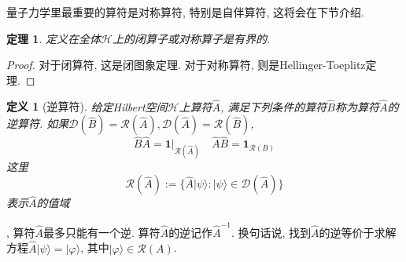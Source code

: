 \documentclass[a4paper,11pt]{book}
\newtheorem{definition}{\hspace{2em}定义}[section]
\newtheorem{theorem}{\hspace{2em}定理}[section]
\newtheorem{proof}{证明}[section]
\begin{document}
量子力学里最重要的算符是对称算符, 特别是自伴算符, 这将会在下节介绍.
\begin{theorem}\label{Bounded operator theorem}
  定义在全体$\mathcal{H}$上的闭算子或对称算子是有界的.
\end{theorem}
\begin{proof}
  对于闭算符, 这是闭图象定理. 对于对称算符, 则是Hellinger-Toeplitz定理.
\end{proof}
\begin{definition}[逆算符]
  给定Hilbert空间$\mathcal{H}$上算符$\hat{A}$, 满足下列条件的算符$\hat{B}$称为算符$\hat{A}$的逆算符. 如果$\mathcal{D}(\hat{B})=\mathcal{R}(\hat{A}), \mathcal{D}(\hat{A})=\mathcal{R}(\hat{B})$,
\begin{equation*}
  \hat{B}\hat{A}=\mathbf{1}|_{\mathcal{R}(\hat{A})}\quad\hat{A}\hat{B}=\mathbf{1}_{\mathcal{R}(B)}
\end{equation*}
这里
\begin{equation*}
  \mathcal{R}(\hat{A}):=\{\hat{A}|\psi\rangle:|\psi\rangle\in \mathcal{D}(\hat{A})\}
\end{equation*}
表示$\hat{A}$的值域
\end{definition}
, 算符$\hat{A}$最多只能有一个逆. 算符$\hat{A}$的逆记作$\hat{A}^{-1}$. 换句话说, 找到$\hat{A}$的逆等价于求解方程$\hat{A}|\psi\rangle=|\varphi\rangle$, 其中$|\varphi\rangle\in\mathcal{R}(A)$.
\end{document}
